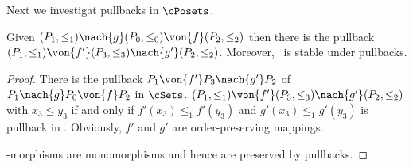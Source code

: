 Next we investigat pullbacks in $\cPosets$.
\begin{lemma}
Given $(P_1,\le_1) \nach{g} (P_0,\le_0) \von{f} (P_2,\le_2)$  then there is the pullback
	     $(P_1,\le_1) \von{f'} (P_3,\le_3)  \nach{g'} (P_2,\le_2)$.
				Moreover,  \M \ is stable under pullbacks.
\end{lemma}
\begin{proof}
There is the pullback   $P_1 \von{f'} P_3 \nach{g'} P_2$ of $P_1 \nach{g} P_0 \von{f} P_2$   in $\cSets$.
$(P_1,\le_1) \von{f'} (P_3,\le_3)  \nach{g'} (P_2,\le_2)$ with $x_3 \le y_3$ if and only if $f'(x_3) \le_1 f'(y_3)$ and $g'(x_3) \le_1 g'(y_3)$ is pullback in \cPosets. Obviously, $f'$ and $g'$ are order-preserving mappings.

 \M-morphisms are monomorphisms and hence are preserved by pullbacks. 
\end{proof}


\begin{theorem}
  \label{l.madHLR.posets}
\end{theorem}

